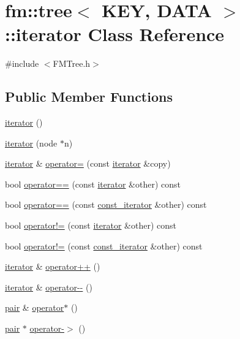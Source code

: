\hypertarget{classfm_1_1tree_1_1iterator}{
\section{fm::tree$<$ KEY, DATA $>$::iterator Class Reference}
\label{classfm_1_1tree_1_1iterator}
}


{\ttfamily \#include $<$FMTree.h$>$}

\subsection*{Public Member Functions}
\begin{DoxyCompactItemize}
\item 
\hyperlink{classfm_1_1tree_1_1iterator_a5d645bbdb4afa62aa8ac671ad22fe6ab}{iterator} ()
\item 
\hyperlink{classfm_1_1tree_1_1iterator_a730df48bcab7ac8e57778ec14147ceec}{iterator} (node $\ast$n)
\item 
\hyperlink{classfm_1_1tree_1_1iterator}{iterator} \& \hyperlink{classfm_1_1tree_1_1iterator_a00ae030a556bb643fb02263b96588353}{operator=} (const \hyperlink{classfm_1_1tree_1_1iterator}{iterator} \&copy)
\item 
bool \hyperlink{classfm_1_1tree_1_1iterator_ad214b7f65df9300b05b4245c16baa13b}{operator==} (const \hyperlink{classfm_1_1tree_1_1iterator}{iterator} \&other) const 
\item 
bool \hyperlink{classfm_1_1tree_1_1iterator_a0fe9666c7aec5897dee88e2716cbdadc}{operator==} (const \hyperlink{classfm_1_1tree_1_1const__iterator}{const\_\-iterator} \&other) const 
\item 
bool \hyperlink{classfm_1_1tree_1_1iterator_a396da2004d0c25df7102a7e677d42d2c}{operator!=} (const \hyperlink{classfm_1_1tree_1_1iterator}{iterator} \&other) const 
\item 
bool \hyperlink{classfm_1_1tree_1_1iterator_ae9c895616a11d451dd9a7d1c83e3dc8a}{operator!=} (const \hyperlink{classfm_1_1tree_1_1const__iterator}{const\_\-iterator} \&other) const 
\item 
\hyperlink{classfm_1_1tree_1_1iterator}{iterator} \& \hyperlink{classfm_1_1tree_1_1iterator_a30b9d6cfbee2d4431066663bbb222efa}{operator++} ()
\item 
\hyperlink{classfm_1_1tree_1_1iterator}{iterator} \& \hyperlink{classfm_1_1tree_1_1iterator_a0a97ac39ce942de1f122378368388030}{operator-\/-\/} ()
\item 
\hyperlink{classfm_1_1pair}{pair} \& \hyperlink{classfm_1_1tree_1_1iterator_a9121ebbd91454a72cb6c561f2a0e09c0}{operator$\ast$} ()
\item 
\hyperlink{classfm_1_1pair}{pair} $\ast$ \hyperlink{classfm_1_1tree_1_1iterator_ab0a8e9b231cf55004c5d06d3292c6756}{operator-\/$>$} ()
\end{DoxyCompactItemize}
